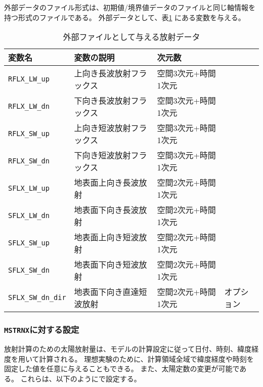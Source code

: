 \noindent
外部データのファイル形式は、初期値/境界値データのファイルと同じ軸情報を持つ{\netcdf}形式のファイルである。
外部データとして、表\ref{tab:var_list_atm_rd_offline} にある変数を与える。
\begin{table}[h]
\begin{center}
  \caption{外部ファイルとして与える放射データ}
  \label{tab:var_list_atm_rd_offline}
  \begin{tabularx}{150mm}{lXll} \hline
    \rowcolor[gray]{0.9}  変数名 & 変数の説明 & 次元数 & \\ \hline
      \verb|RFLX_LW_up|     & 上向き長波放射フラックス & 空間3次元+時間1次元 \\
      \verb|RFLX_LW_dn|     & 下向き長波放射フラックス & 空間3次元+時間1次元 \\
      \verb|RFLX_SW_up|     & 上向き短波放射フラックス & 空間3次元+時間1次元 \\
      \verb|RFLX_SW_dn|     & 下向き短波放射フラックス & 空間3次元+時間1次元 \\
      \verb|SFLX_LW_up|     & 地表面上向き長波放射　　 & 空間2次元+時間1次元 \\
      \verb|SFLX_LW_dn|     & 地表面下向き長波放射　　 & 空間2次元+時間1次元 \\
      \verb|SFLX_SW_up|     & 地表面上向き短波放射　　 & 空間2次元+時間1次元 \\
      \verb|SFLX_SW_dn|     & 地表面下向き短波放射　　 & 空間2次元+時間1次元 \\
      \verb|SFLX_SW_dn_dir| & 地表面下向き直達短波放射 & 空間2次元+時間1次元 & オプション \\
    \hline
  \end{tabularx}
\end{center}
\end{table}


\subsubsection{\texttt{MSTRNX}に対する設定}

放射計算のための太陽放射量は、モデルの計算設定に従って日付、時刻、緯度経度を用いて計算される。
理想実験のために、計算領域全域で緯度経度や時刻を固定した値を任意に与えることもできる。
また、太陽定数の変更が可能である。
これらは、以下のようにで設定する。


